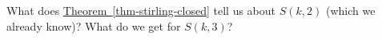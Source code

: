 \documentclass{book}
\begin{document}
\setcounter{project}{286}
\addtocounter{project}{-1}
\begin{activity}[]\label{activity-279}
\hypertarget{p-1487}{}%
What does \hyperref[thm-stirling-closed]{Theorem~\ref{thm-stirling-closed}} tell us about \(S(k, 2)\) (which we already know)?  What do we get for \(S(k,3)\)?%
\end{activity}
\end{document}
